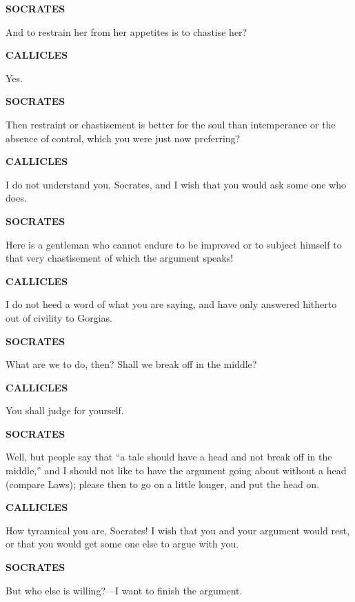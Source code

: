 \documentclass[11pt,letter]{article}
\begin{document}
\par \textbf{SOCRATES}
\par   And to restrain her from her appetites is to chastise her?

\par \textbf{CALLICLES}
\par   Yes.

\par \textbf{SOCRATES}
\par   Then restraint or chastisement is better for the soul than intemperance or the absence of control, which you were just now preferring?

\par \textbf{CALLICLES}
\par   I do not understand you, Socrates, and I wish that you would ask some one who does.

\par \textbf{SOCRATES}
\par   Here is a gentleman who cannot endure to be improved or to subject himself to that very chastisement of which the argument speaks!

\par \textbf{CALLICLES}
\par   I do not heed a word of what you are saying, and have only answered hitherto out of civility to Gorgias.

\par \textbf{SOCRATES}
\par   What are we to do, then? Shall we break off in the middle?

\par \textbf{CALLICLES}
\par   You shall judge for yourself.

\par \textbf{SOCRATES}
\par   Well, but people say that “a tale should have a head and not break off in the middle,” and I should not like to have the argument going about without a head (compare Laws); please then to go on a little longer, and put the head on.

\par \textbf{CALLICLES}
\par   How tyrannical you are, Socrates! I wish that you and your argument would rest, or that you would get some one else to argue with you.

\par \textbf{SOCRATES}
\par   But who else is willing?—I want to finish the argument.
\end{document}
